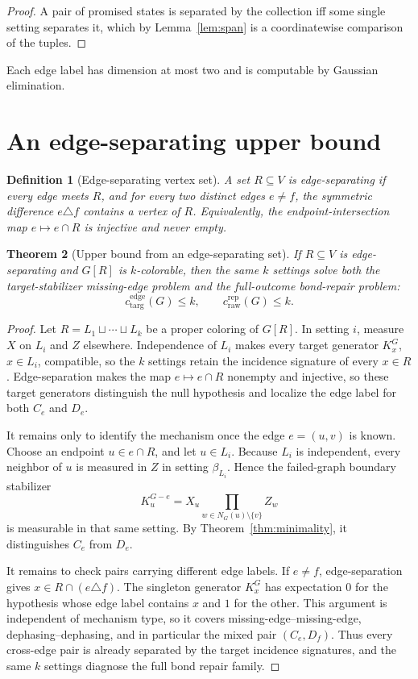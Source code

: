 \documentclass[11pt]{article}
\newtheorem{theorem}{Theorem}[section]
\newtheorem{definition}[theorem]{Definition}
\theoremstyle{remark}
\newcommand{\cdiag}{c_{\mathrm{targ}}^{\mathrm{edge}}}
\newcommand{\crep}{c_{\mathrm{raw}}^{\mathrm{rep}}}
\begin{document}
\begin{proof}
A pair of promised states is separated by the collection iff some single setting separates it, which by Lemma~\ref{lem:span} is a coordinatewise comparison of the tuples.
\end{proof}

Each edge label has dimension at most two and is computable by Gaussian elimination.

\section{An edge-separating upper bound}\label{sec:twoset}

\begin{definition}[Edge-separating vertex set]\label{def:edgeseparating}
A set \(R\subseteq V\) is \emph{edge-separating} if every edge meets \(R\), and for every two distinct edges \(e\neq f\), the symmetric difference \(e\triangle f\) contains a vertex of \(R\). Equivalently, the endpoint-intersection map \(e\mapsto e\cap R\) is injective and never empty.
\end{definition}

\begin{theorem}[Upper bound from an edge-separating set]\label{thm:edgecover}
If \(R\subseteq V\) is edge-separating and \(G[R]\) is \(k\)-colorable, then the same $k$ settings solve both the target-stabilizer missing-edge problem and the full-outcome bond-repair problem:
\[
\cdiag(G)\le k,\qquad \crep(G)\le k.
\]
\end{theorem}

\begin{proof}
Let \(R=L_1\sqcup\cdots\sqcup L_k\) be a proper coloring of \(G[R]\).  In setting \(i\), measure \(X\) on \(L_i\) and \(Z\) elsewhere.  Independence of \(L_i\) makes every target generator $K_x^G$, \(x\in L_i\), compatible, so the \(k\) settings retain the incidence signature of every \(x\in R\). Edge-separation makes the map $e\mapsto e\cap R$ nonempty and injective, so these target generators distinguish the null hypothesis and localize the edge label for both $C_e$ and $D_e$.

It remains only to identify the mechanism once the edge $e=(u,v)$ is known. Choose an endpoint $u\in e\cap R$, and let $u\in L_i$. Because $L_i$ is independent, every neighbor of $u$ is measured in $Z$ in setting $\beta_{L_i}$. Hence the failed-graph boundary stabilizer
\[
K_u^{G-e}=X_u\prod_{w\in N_G(u)\setminus\{v\}}Z_w
\]
is measurable in that same setting. By Theorem~\ref{thm:minimality}, it distinguishes $C_e$ from $D_e$.\par

It remains to check pairs carrying different edge labels. If $e\neq f$, edge-separation gives $x\in R\cap(e\triangle f)$. The singleton generator $K_x^G$ has expectation $0$ for the hypothesis whose edge label contains $x$ and $1$ for the other. This argument is independent of mechanism type, so it covers missing-edge--missing-edge, dephasing--dephasing, and in particular the mixed pair $(C_e,D_f)$. Thus every cross-edge pair is already separated by the target incidence signatures, and the same $k$ settings diagnose the full bond repair family.
\end{proof}
\end{document}
